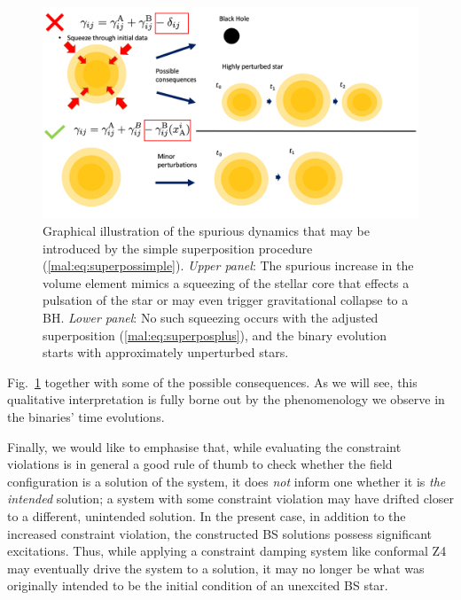 \begin{figure}[t]
    \centering
    \includegraphics[width=350pt]{malaise_source/BosonStarTrick.png}
    \caption{
    Graphical illustration of the spurious dynamics that
    may be introduced by the simple superposition
    procedure (\ref{mal:eq:superpossimple}). {\it Upper panel}:
    The spurious
    increase in the volume element mimics a squeezing of the
    stellar core that effects a pulsation of the star or
    may even trigger gravitational collapse to a BH.
    {\it Lower panel}: No such squeezing occurs with the
    adjusted superposition (\ref{mal:eq:superposplus}),
    and the binary evolution starts with approximately
    unperturbed stars.
    }
    \label{mal:fig:Overview}
\end{figure}
%
Fig.~\ref{mal:fig:Overview} together with some of the possible
consequences.
As we will see, this qualitative interpretation is fully borne out
by the phenomenology we observe in the binaries' time evolutions.

Finally, we would like to emphasise that, while evaluating the constraint violations is in general a good rule of thumb to check whether the field configuration is a solution of the system, it does \emph{not} inform one whether it is \emph{the intended} solution; a system with some constraint violation may have drifted closer to a different, unintended solution. In the present case, in addition to the  increased constraint violation, the constructed BS solutions possess significant excitations. Thus, while applying a constraint damping system like conformal Z4
\cite{Bernuzzi:2009ex,Alic:2011gg}
may eventually drive the system to a solution, it may no longer be what was originally intended to be the initial condition of an unexcited BS star.


